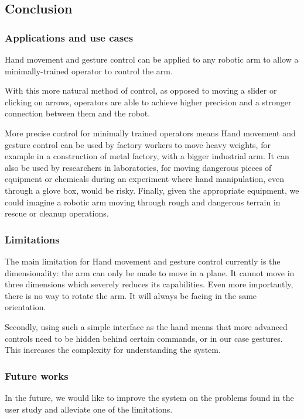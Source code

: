 \subsection{Conclusion}

\subsubsection{Applications and use cases}

Hand movement and gesture control can be applied to any robotic arm to allow a minimally-trained operator to control the arm.

With this more natural method of control, as opposed to moving a slider or clicking on arrows, operators are able to achieve higher precision and a stronger connection between them and the robot.

More precise control for minimally trained operators means Hand movement and gesture control can be used by factory workers to move heavy weights, for example in a construction of metal factory, with a bigger industrial arm. It can also be used by researchers in laboratories, for moving dangerous pieces of equipment or chemicals during an experiment where hand manipulation, even through a glove box, would be risky. Finally, given the appropriate equipment, we could imagine a robotic arm moving through rough and dangerous terrain in rescue or cleanup operations.

\subsubsection{Limitations}

The main limitation for Hand movement and gesture control currently is the dimensionality: the arm can only be made to move in a plane. It cannot move in three dimensions which severely reduces its capabilities. Even more importantly, there is no way to rotate the arm. It will always be facing in the same orientation.

Secondly, using such a simple interface as the hand means that more advanced controls need to be hidden behind certain commands, or in our case gestures. This increases the complexity for understanding the system.

\subsubsection{Future works}

In the future, we would like to improve the system on the problems found in the user study and alleviate one of the limitations.

